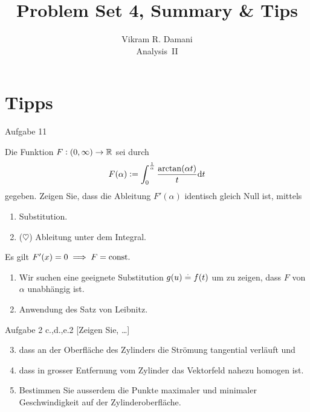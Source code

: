 \documentclass[12pt]{article}
\begin{document}
\title{\vspace*{-2.5em}Problem Set 4, Summary \& Tips}
\author{Vikram R. Damani\\
    Analysis~II}

\maketitle


\section{Tipps}

\begin{nexercise}{Aufgabe 1}{1}
    Die Funktion $F:(0,\infty)\to\mathbb{R}$ sei durch
    \begin{align}
        F(\alpha):=\int_{0}^{\frac{1}{\alpha}} \frac{\arctan(\alpha t)}{t}\mathrm{d}t
    \end{align}
    gegeben. Zeigen Sie, dass die Ableitung $F'(\alpha)$
    identisch gleich Null ist, mittels
    \begin{enumerate}[label=\alph*.]
        \item Substitution.
        \item ($\heartsuit$) Ableitung unter dem Integral.
    \end{enumerate}
\end{nexercise}

\begin{tips}{1}
    Es gilt $F'(x)=0\implies F = \mathrm{const}.$
    \begin{enumerate}[label=\alph*.]
        \item Wir suchen eine geeignete Substitution $g(u)\overset{.}{=}{f}(t)$ um zu zeigen, dass $F$ von $\alpha$ unabhängig  ist.
        \item Anwendung des Satz von Leibnitz.
    \end{enumerate}
\end{tips}\vspace*{1em}

\begin{nexercise}{Aufgabe 2 c.,d.,e.}{2}
    [Zeigen Sie, \dots]
    \begin{enumerate}[label=\alph*.]
        \setcounter{enumi}{2}
        \item dass an der Oberfläche des Zylinders die Strömung tangential verläuft und
        \item dass in grosser Entfernung vom Zylinder das Vektorfeld nahezu homogen ist.
        \item Bestimmen Sie ausserdem die Punkte maximaler und minimaler Geschwindigkeit auf der Zylinderoberfläche.
    \end{enumerate}
\end{nexercise}
\end{document}

